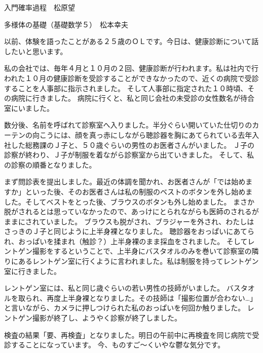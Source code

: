 入門確率過程　松原望

多様体の基礎（基礎数学５）　松本幸夫



以前、体験を語ったことがある２５歳のＯＬです。今日は、健康診断について話したいと思います。

私の会社では、毎年４月と１０月の２回、健康診断が行われます。私は社内で行われた１０月の健康診断を受診することができなかったので、近くの病院で受診することを人事部に指示されました。
そして人事部に指定された１０時頃、その病院に行きました。
病院に行くと、私と同じ会社の未受診の女性数名が待合室にいました。

数分後、名前を呼ばれて診察室へ入りました。半分ぐらい開いていた仕切りのカーテンの向こうには、顔を真っ赤にしながら聴診器を胸にあてられている去年入社した総務課のＪ子と、５０歳ぐらいの男性のお医者さんがいました。
Ｊ子の診察が終わり、Ｊ子が制服を着ながら診察室から出ていきました。
そして、私の診察の順番となりました。

まず問診表を提出しました。最近の体調を聞かれ、お医者さんが「では始めますか」といった後、そのお医者さんは私の制服のベストのボタンを外し始めました。そしてベストをとった後、ブラウスのボタンも外し始めました。
まさか脱がされるとは思っていなかったので、あっけにとられながらも医師のされるがままにされていました。
ブラウスも脱がされ、ブラジャーを外され、わたしはさっきのＪ子と同じように上半身裸となりました。
聴診器をおっぱいにあてられ、おっぱいを揉まれ（触診？）上半身裸のまま採血をされました。
そしてレントゲン撮影をするということで、上半身にバスタオルのみを巻いて診察室の隣りにあるレントゲン室に行くように言われました。私は制服を持ってレントゲン室に行きました。

レントゲン室には、私と同じ歳ぐらいの若い男性の技師がいました。
バスタオルを取られ、再度上半身裸となりました。その技師は「撮影位置が合わない…」と言いながら、カメラに押しつけられた私のおっぱいを何回か触りました。
レントゲン撮影が終了し、ようやく診察が終了しました。

検査の結果「要、再検査」となりました。明日の午前中に再検査を同じ病院で受診することになっています。
今、ものすご～くいやな鬱な気分です。



